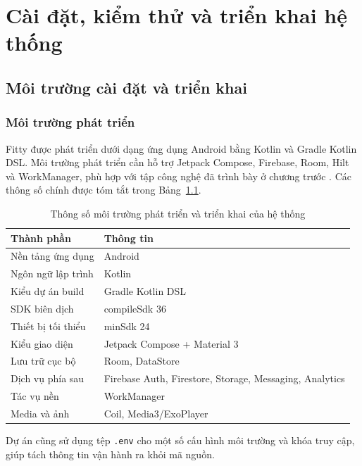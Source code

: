 \chapter{Cài đặt, kiểm thử và triển khai hệ thống}
\label{chap:experiment}

\section{Môi trường cài đặt và triển khai}

\subsection{Môi trường phát triển}

Fitty được phát triển dưới dạng ứng dụng Android bằng Kotlin và Gradle Kotlin DSL. Môi trường phát triển cần hỗ trợ Jetpack Compose, Firebase, Room, Hilt và WorkManager, phù hợp với tập công nghệ đã trình bày ở chương trước \cite{android_jetpack,android_compose,android_hilt,android_room,android_workmanager,firebase_setup}. Các thông số chính được tóm tắt trong Bảng~\ref{tab:dev-environment}.

\begin{table}[H]
\centering
\small
\caption{Thông số môi trường phát triển và triển khai của hệ thống}
\label{tab:dev-environment}
\begin{tabular}{|p{4.3cm}|p{7.8cm}|}
\hline
\textbf{Thành phần} & \textbf{Thông tin} \\ \hline
Nền tảng ứng dụng & Android \\ \hline
Ngôn ngữ lập trình & Kotlin \\ \hline
Kiểu dự án build & Gradle Kotlin DSL \\ \hline
SDK biên dịch & compileSdk 36 \\ \hline
Thiết bị tối thiểu & minSdk 24 \\ \hline
Kiểu giao diện & Jetpack Compose + Material 3 \\ \hline
Lưu trữ cục bộ & Room, DataStore \\ \hline
Dịch vụ phía sau & Firebase Auth, Firestore, Storage, Messaging, Analytics \\ \hline
Tác vụ nền & WorkManager \\ \hline
Media và ảnh & Coil, Media3/ExoPlayer \\ \hline
\end{tabular}
\normalsize
\end{table}

Dự án cũng sử dụng tệp \texttt{.env} cho một số cấu hình môi trường và khóa truy cập, giúp tách thông tin vận hành ra khỏi mã nguồn.

